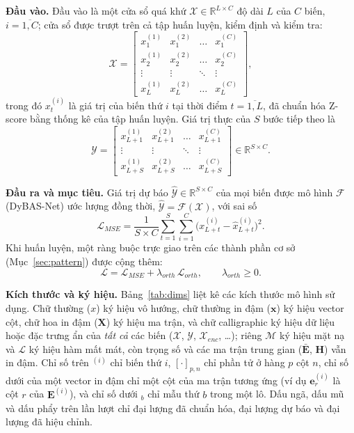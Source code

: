 \documentclass[conference]{IEEEtran}
\newcommand{\R}{\mathbb{R}}
\begin{document}
\textbf{Đầu vào.} Đầu vào là một cửa sổ quá khứ $\mathcal{X}\in\R^{L\times C}$ độ dài $L$ của $C$ biến,
$i=\overline{1,C}$; cửa sổ được trượt trên cả tập huấn luyện, kiểm định và kiểm tra:
\begin{equation}
\mathcal{X}=
\begin{bmatrix}
x^{(1)}_1 & x^{(2)}_1 & \dots & x^{(C)}_1\\
x^{(1)}_2 & x^{(2)}_2 & \dots & x^{(C)}_2\\
\vdots & \vdots & \ddots & \vdots\\
x^{(1)}_L & x^{(2)}_L & \dots & x^{(C)}_L
\end{bmatrix},
\label{eq:input}
\end{equation}
trong đó $x^{(i)}_t$ là giá trị của biến thứ $i$ tại thời điểm $t=\overline{1,L}$, đã chuẩn hóa Z-score bằng thống kê
của tập huấn luyện. Giá trị thực của $S$ bước tiếp theo là
\begin{equation}
\mathcal{Y}=
\begin{bmatrix}
x^{(1)}_{L+1} & x^{(2)}_{L+1} & \dots & x^{(C)}_{L+1}\\
\vdots & \vdots & \ddots & \vdots\\
x^{(1)}_{L+S} & x^{(2)}_{L+S} & \dots & x^{(C)}_{L+S}
\end{bmatrix}\in\R^{S\times C}.
\label{eq:label}
\end{equation}

\textbf{Đầu ra và mục tiêu.} Giá trị dự báo $\hat{\mathcal{Y}}\in\R^{S\times C}$ của mọi biến được mô hình $\mathcal{F}$
(DyBAS-Net) ước lượng đồng thời, $\hat{\mathcal{Y}}=\mathcal{F}(\mathcal{X})$, với sai số
\begin{equation}
\mathcal{L}_{MSE}=\frac{1}{S\times C}\sum_{t=1}^{S}\sum_{i=1}^{C}\big(x^{(i)}_{L+t}-\hat{x}^{(i)}_{L+t}\big)^2 .
\label{eq:mse}
\end{equation}
Khi huấn luyện, một ràng buộc trực giao trên các thành phần cơ sở (Mục~\ref{sec:pattern}) được cộng thêm:
\begin{equation}
\mathcal{L}=\mathcal{L}_{MSE}+\lambda_{orth}\,\mathcal{L}_{orth},\qquad \lambda_{orth}\ge0 .
\label{eq:objective}
\end{equation}

\textbf{Kích thước và ký hiệu.} Bảng~\ref{tab:dims} liệt kê các kích thước mô hình sử dụng. Chữ thường ($x$) ký hiệu vô
hướng, chữ thường in đậm ($\mathbf{x}$) ký hiệu vector cột, chữ hoa in đậm ($\mathbf{X}$) ký hiệu ma trận, và chữ
calligraphic ký hiệu dữ liệu hoặc đặc trưng ẩn của \emph{tất cả} các biến ($\mathcal{X}$, $\mathcal{Y}$,
$\mathcal{X}_{enc}$, \dots); riêng $\mathcal{M}$ ký hiệu mặt nạ và $\mathcal{L}$ ký hiệu hàm mất mát, còn trọng số và các
ma trận trung gian ($\bar{\mathbf{E}}$, $\mathbf{H}$) vẫn in đậm. Chỉ số trên $^{(i)}$ chỉ biến thứ $i$,
$[\cdot]_{p,n}$ chỉ phần tử ở hàng $p$ cột $n$, chỉ số dưới của một vector in đậm chỉ một cột của ma trận tương ứng (ví
dụ $\mathbf{e}^{(i)}_r$ là cột $r$ của $\mathbf{E}^{(i)}$), và chỉ số dưới $_b$ chỉ mẫu thứ $b$ trong một lô. Dấu ngã,
dấu mũ và dấu phẩy trên lần lượt chỉ đại lượng đã chuẩn hóa, đại lượng dự báo và đại lượng đã hiệu chỉnh.
\end{document}

